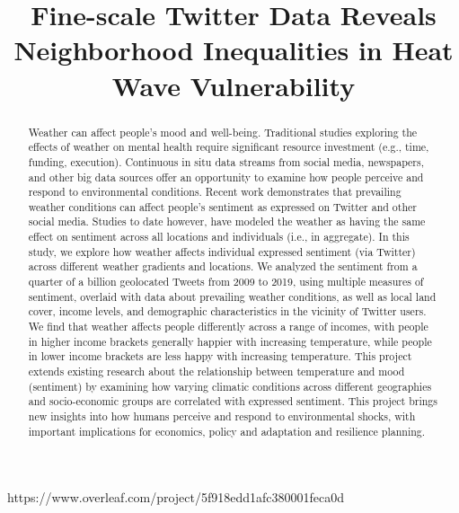 \documentclass{article}
\begin{document}
https://www.overleaf.com/project/5f918edd1afc380001feca0d
\title{Fine-scale Twitter Data Reveals Neighborhood Inequalities in Heat Wave Vulnerability}



\maketitle

\begin{abstract}
Weather can affect people’s mood and well-being. Traditional studies exploring the effects of weather on mental health require significant resource investment (e.g., time, funding, execution).  Continuous in situ data streams from social media, newspapers, and other big data sources offer an opportunity to examine how people perceive and respond to environmental conditions. Recent work demonstrates that prevailing weather conditions can affect people’s sentiment as expressed on Twitter and other social media.  Studies to date however, have modeled the weather as having the same effect on sentiment across all locations and individuals (i.e., in aggregate).  In this study, we explore how weather affects individual expressed sentiment (via Twitter) across different weather gradients and locations. We analyzed the sentiment from a quarter of a billion geolocated Tweets from 2009 to 2019, using multiple measures of sentiment, overlaid with data about prevailing weather conditions, as well as local land cover, income levels, and demographic characteristics in the vicinity of Twitter users.  We find that weather affects people differently across a range of incomes, with people in higher income brackets generally happier with increasing temperature, while people in lower income brackets are less happy with increasing temperature.  This project extends existing research about the relationship between temperature and mood (sentiment) by examining how varying climatic conditions across different geographies and socio-economic groups are correlated with expressed sentiment. This project brings new insights into how humans perceive and respond to environmental shocks, with important implications for economics, policy and adaptation and resilience planning.

\end{abstract}
\end{document}
